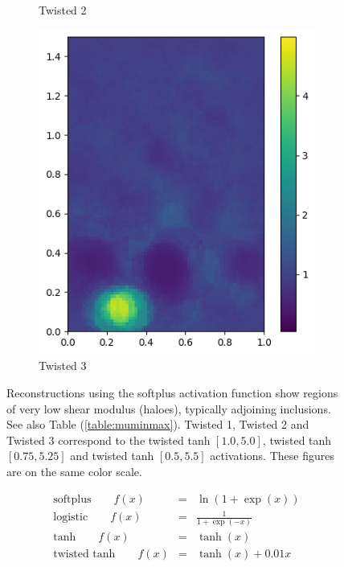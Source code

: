 \documentclass[12pt]{article}
\newcommand{\ber}{\begin{eqnarray}}
\newcommand{\eer}{\end{eqnarray}}
\newcommand{\nhghaloesheight}{3.2cm}
\newcommand{\nhghaloeswidth}{2.6cm}
\begin{document}
\begin{figure}[h]
\begin{subfigure}[c]{\nhghaloeswidth}
    \caption{\label{fig:haloes_tanhp25} Twisted 2}        
  \end{subfigure}
  \begin{subfigure}[c]{\nhghaloeswidth}      
    \includegraphics[totalheight=\nhghaloesheight]{Figures/softplus_halos/ex1/mutanhshiftp50.png}
    \caption{\label{fig:haloes_tanhp50} Twisted 3}            
  \end{subfigure}    
  \caption{\label{fig:haloes} Reconstructions using the softplus activation function show regions of very low shear modulus (haloes), typically adjoining inclusions. See also Table (\ref{table:muminmax}). Twisted 1, Twisted 2 and Twisted 3 correspond to the twisted tanh $[1.0,5.0]$, twisted tanh $[0.75,5.25]$ and twisted tanh $[0.5, 5.5]$ activations. These figures are on the same color scale.}
\end{figure}
% 
\begin{subequations}
\ber
\text{softplus}\qquad f(x) &=& \ln(1+\exp(x)) \label{eqn:softplus}\\
\text{logistic}\qquad f(x) &=& \frac{1}{1+\exp(-x)}\label{eqn:logistic}\\
\text{tanh} \qquad f(x) &=& \tanh(x) \label{eqn:tanh}\\
\text{twisted tanh} \qquad f(x) &=& \tanh(x) + 0.01x  \label{eqn:twisttanh}
\eer
\label{eqn:activations}
\end{subequations}
\end{document}
